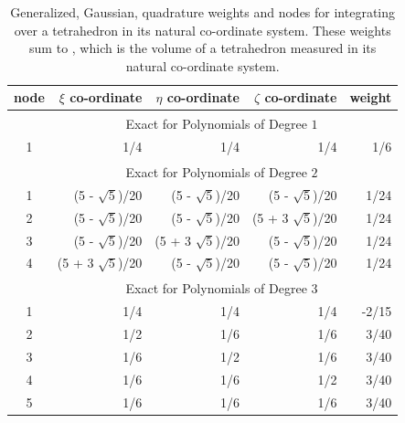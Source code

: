 \begin{table}
    \centering
    \begin{tabular}{|c|rrrr|}
        \hline
        node & \centering $\xi$ co-ordinate & $\eta$ co-ordinate & 
        $\zeta$ co-ordinate & weight \\ \hline        
        & \multicolumn{4}{|c|}{Exact for Polynomials of Degree $1^{\phantom{|^|}}$} \\ 
        \hline
        1 & 1/4 & 1/4 & 1/4 & 1/6 \\ 
        \hline
        & \multicolumn{4}{|c|}{Exact for Polynomials of Degree $2^{\phantom{|^|}}$} \\ \hline
        1 & (5 - $\sqrt{5}$)/20 & (5 - $\sqrt{5}$)/20 & (5 - $\sqrt{5}$)/20 & 1/24\\
        2 & (5 - $\sqrt{5}$)/20 & (5 - $\sqrt{5}$)/20 & (5 + 3 $\sqrt{5}$)/20 & 1/24\\
        3 & (5 - $\sqrt{5}$)/20 & (5 + 3 $\sqrt{5}$)/20 & (5 - $\sqrt{5}$)/20 & 1/24\\ 
        4 & (5 + 3 $\sqrt{5}$)/20 & (5 - $\sqrt{5}$)/20 & (5 - $\sqrt{5}$)/20 & 1/24\\ 
        \hline
        & \multicolumn{4}{|c|}{Exact for Polynomials of Degree $3^{\phantom{|^|}}$} \\ \hline
        1 & 1/4 & 1/4 & 1/4 & -2/15 \\
        2 & 1/2 & 1/6 & 1/6 & 3/40\\
        3 & 1/6 & 1/2 & 1/6 & 3/40\\ 
        4 & 1/6 & 1/6 & 1/2 & 3/40 \\
        5 & 1/6 & 1/6 & 1/6 & 3/40 \\
        \hline
    \end{tabular}
    \caption{Generalized, Gaussian, quadrature weights and nodes for integrating over a tetrahedron in its natural co-ordinate system.  These weights sum to , which is the volume of a tetrahedron measured in its natural co-ordinate system.}
    \label{tabQuadraturetetra}
\end{table} 
